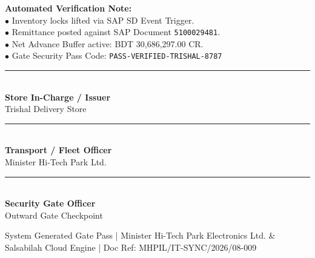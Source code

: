 \documentclass[11pt, a4paper]{article}
\begin{document}
\vspace{-4pt}

\begin{tcolorbox}[colback=lightgrey, colframe=bordergrey, arc=3pt, left=8pt, right=8pt, top=6pt, bottom=6pt]
  \begin{minipage}{0.65\textwidth}
    \small
    \textbf{Automated Verification Note:} \\
    $\bullet$ Inventory locks lifted via SAP SD Event Trigger. \\
    $\bullet$ Remittance posted against SAP Document \texttt{5100029481}. \\
    $\bullet$ Net Advance Buffer active: BDT 30,686,297.00 CR. \\
    $\bullet$ Gate Security Pass Code: \texttt{PASS-VERIFIED-TRISHAL-8787}
  \end{minipage}%
  \begin{minipage}{0.34\textwidth}
    \centering
  \end{minipage}
\end{tcolorbox}

\vspace{25pt}

\begin{minipage}{0.32\textwidth}
  \centering
  \rule{0.8\textwidth}{0.5pt} \\
  \vspace{3pt}
  \small \textbf{Store In-Charge / Issuer} \\
  \tiny Trishal Delivery Store
\end{minipage}%
\begin{minipage}{0.32\textwidth}
  \centering
  \rule{0.8\textwidth}{0.5pt} \\
  \vspace{3pt}
  \small \textbf{Transport / Fleet Officer} \\
  \tiny Minister Hi-Tech Park Ltd.
\end{minipage}%
\begin{minipage}{0.32\textwidth}
  \centering
  \rule{0.8\textwidth}{0.5pt} \\
  \vspace{3pt}
  \small \textbf{Security Gate Officer} \\
  \tiny Outward Gate Checkpoint
\end{minipage}

\vfill
\centerline{\tiny \color{gray} System Generated Gate Pass | Minister Hi-Tech Park Electronics Ltd. \& Salsabilah Cloud Engine | Doc Ref: MHPIL/IT-SYNC/2026/08-009}
\end{document}

